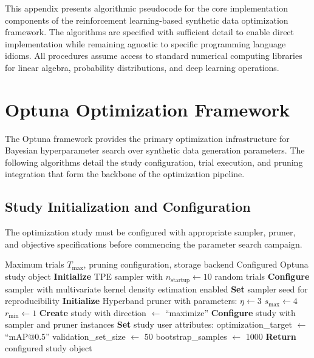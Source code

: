 
This appendix presents algorithmic pseudocode for the core implementation components of the reinforcement learning-based synthetic data optimization framework. The algorithms are specified with sufficient detail to enable direct implementation while remaining agnostic to specific programming language idioms. All procedures assume access to standard numerical computing libraries for linear algebra, probability distributions, and deep learning operations.

\section{Optuna Optimization Framework}
\label{sec:optuna_implementation}

The Optuna framework provides the primary optimization infrastructure for Bayesian hyperparameter search over synthetic data generation parameters. The following algorithms detail the study configuration, trial execution, and pruning integration that form the backbone of the optimization pipeline.

\subsection{Study Initialization and Configuration}

The optimization study must be configured with appropriate sampler, pruner, and objective specifications before commencing the parameter search campaign.

\begin{algorithm}[H]
\caption{Optuna Study Initialization}
\label{alg:optuna_init}
\begin{algorithmic}[1]
\Require Maximum trials $T_{\max}$, pruning configuration, storage backend
\Ensure Configured Optuna study object
\State \textbf{Initialize} TPE sampler with $n_{\text{startup}} \gets 10$ random trials
\State \textbf{Configure} sampler with multivariate kernel density estimation enabled
\State \textbf{Set} sampler seed for reproducibility
\State \textbf{Initialize} Hyperband pruner with parameters:
\State \hspace{1em} $\eta \gets 3$ 
\State \hspace{1em} $s_{\max} \gets 4$ 
\State \hspace{1em} $r_{\min} \gets 1$ 
\State \textbf{Create} study with direction $\gets$ ``maximize''
\State \textbf{Configure} study with sampler and pruner instances
\State \textbf{Set} study user attributes:
\State \hspace{1em} optimization\_target $\gets$ ``mAP@0.5''
\State \hspace{1em} validation\_set\_size $\gets$ 50
\State \hspace{1em} bootstrap\_samples $\gets$ 1000
\State \textbf{Return} configured study object
\end{algorithmic}
\end{algorithm}

